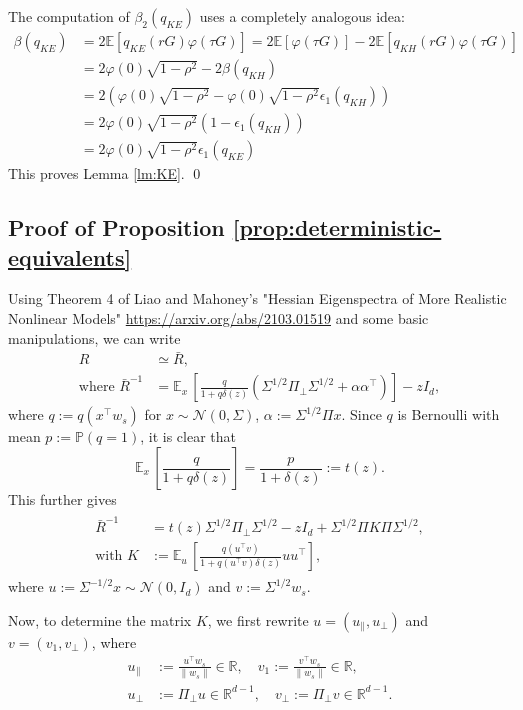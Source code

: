 The computation of $\beta_2(q_{KE})$ uses a completely analogous idea:
\begin{align*}
    \beta(q_{KE}) &= 2\mathbb E[q_{KE}(rG)\varphi(\tau G)]=2\mathbb E[\varphi(\tau G)]-2\mathbb E[q_{KH}(rG)\varphi(\tau G)]\\
    &= 2\varphi(0)\sqrt{1-\rho^2} - 2\beta(q_{KH})\\
    &= 2\left(\varphi(0)\sqrt{1-\rho^2}-\varphi(0)\sqrt{1-\rho^2}\epsilon_1(q_{KH})\right)\\
    &= 2\varphi(0)\sqrt{1-\rho^2}\left(1-\epsilon_1(q_{KH})\right)\\
    &= 2\varphi(0)\sqrt{1-\rho^2}\epsilon_1(q_{KE})
\end{align*}
This proves Lemma \ref{lm:KE}. \qed



\subsection{Proof of Proposition \ref{prop:deterministic-equivalents}}
Using Theorem 4 of Liao and Mahoney's "Hessian Eigenspectra of More Realistic Nonlinear Models"
 \url{https://arxiv.org/abs/2103.01519} and some basic manipulations, we can write
\begin{align}
R &\simeq \bar R,\\
\text{where }\bar R^{-1} &= \mathbb E_x\,\left[\frac{q}{1+q\delta(z)}(\Sigma^{1/2}\Pi_\perp\Sigma^{1/2} + \alpha\alpha^\top)\right]-zI_d,
\end{align}
where $q:=q(x^\top w_s)$ for $x \sim \mathcal N(0,\Sigma)$, $\alpha:=\Sigma^{1/2}\Pi x$. Since $q$ is Bernoulli with mean $p := \mathbb P(q=1)$, it is clear that
$$
\mathbb E_x\,\left[\frac{q}{1+q\delta(z)}\right] = \frac{p}{1+\delta(z)}:=t(z).
$$
This further gives
\begin{eqnarray}
    \begin{split}
\bar R^{-1} &= t(z)\Sigma^{1/2}\Pi_\perp \Sigma^{1/2}-zI_d+\Sigma^{1/2} \Pi K \Pi \Sigma^{1/2},\\
\text{with }K &:= \mathbb E_u\,\left[\frac{q(u^\top v)}{1+q(u^\top v)\delta(z)} uu^\top\right],
\end{split}
\label{eq:magical}
\end{eqnarray}
where $u := \Sigma^{-1/2}x \sim \mathcal N(0,I_d)$ and $v := \Sigma^{1/2}w_s$.

Now, to determine the matrix $K$, we first rewrite $u=(u_\parallel ,u_\perp)$ and $v=(v_1 ,v_\perp)$, where
\begin{align}
u_\parallel  &:= \frac{u^\top  w_s}{\|w_s\|} \in \mathbb R,\quad v_1  := \frac{v^\top w_s}{\|w_s\|} \in \mathbb R,\\
u_\perp &:= \Pi_\perp u \in \mathbb R^{d-1},\quad v_\perp := \Pi_\perp v \in \mathbb R^{d-1}.
\end{align}

